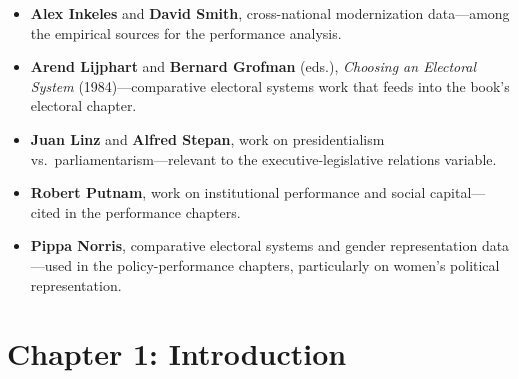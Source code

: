 \documentclass[12pt]{article}
\begin{document}
\begin{itemize}[leftmargin=*, itemsep=4pt]
    \item \textbf{Alex Inkeles} and \textbf{David Smith}, cross-national modernization data---among the empirical sources for the performance analysis.
    \item \textbf{Arend Lijphart} and \textbf{Bernard Grofman} (eds.), \textit{Choosing an Electoral System} (1984)---comparative electoral systems work that feeds into the book's electoral chapter.
    \item \textbf{Juan Linz} and \textbf{Alfred Stepan}, work on presidentialism vs.\ parliamentarism---relevant to the executive-legislative relations variable.
    \item \textbf{Robert Putnam}, work on institutional performance and social capital---cited in the performance chapters.
    \item \textbf{Pippa Norris}, comparative electoral systems and gender representation data---used in the policy-performance chapters, particularly on women's political representation.
\end{itemize}

\section{Chapter 1: Introduction}
\end{document}
